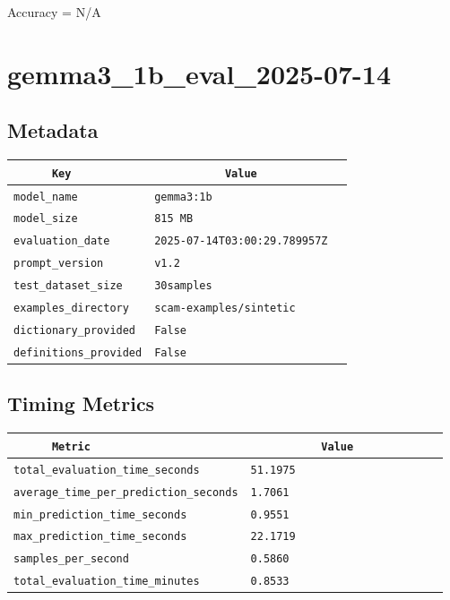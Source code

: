 \documentclass{article}
\begin{document}
\begin{center}
Accuracy = N/A
\end{center}

\section{gemma3\_1b\_eval\_2025-07-14}
\subsection{Metadata}

\begin{center}
\begin{tabular}{l | l} \hline
    \verb|      Key      | & \verb|           Value           | \\ \hline
    \hline
    \verb|model_name    | & \verb|gemma3:1b                    | \\ \hline
    \verb|model_size    | & \verb|815 MB                       | \\ \hline
    \verb|evaluation_date| & \verb|2025-07-14T03:00:29.789957Z  | \\ \hline
    \verb|prompt_version| & \verb|v1.2                         | \\ \hline
    \verb|test_dataset_size| & \verb|30samples                    | \\ \hline
    \verb|examples_directory| & \verb|scam-examples/sintetic       | \\ \hline
    \verb|dictionary_provided| & \verb|False                        | \\ \hline
    \verb|definitions_provided| & \verb|False                        | \\ \hline
\end{tabular}
\end{center}

\subsection{Timing Metrics}

\begin{center}
\begin{tabular}{l | l} \hline
    \verb|      Metric     | & \verb|           Value           | \\ \hline
    \hline
    \verb|total_evaluation_time_seconds| & \verb|51.1975                      | \\ \hline
    \verb|average_time_per_prediction_seconds| & \verb|1.7061                       | \\ \hline
    \verb|min_prediction_time_seconds| & \verb|0.9551                       | \\ \hline
    \verb|max_prediction_time_seconds| & \verb|22.1719                      | \\ \hline
    \verb|samples_per_second| & \verb|0.5860                       | \\ \hline
    \verb|total_evaluation_time_minutes| & \verb|0.8533                       | \\ \hline
\end{tabular}
\end{center}
\end{document}
